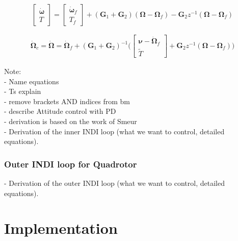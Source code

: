 \documentclass[11pt, a4paper, twoside]{report}
\begin{document}
\begin{equation}
	\begin{bmatrix}
		\bm{\dot{\omega}}\\
		T
	\end{bmatrix} = 
	\begin{bmatrix}
		\bm{\dot{\omega}}_f\\
		T_f
	\end{bmatrix} + (\bm{G}_1+\bm{G}_2)(\bm{\Omega} - \bm{\Omega}_f) - \bm{G}_2z^{-1}(\bm{\Omega} - \bm{\Omega}_f)
	\label{eq:TODO}
\end{equation}

\begin{equation}
	\begin{split}
		\bm{\dot{\Omega}}_c = \bm{\dot{\Omega}} = \bm{\dot{\Omega}}_f + (\bm{G}_1+\bm{G}_2)^{-1} \Bigg(
		\begin{bmatrix}
			\bm{\nu} - \bm{\dot{\Omega}}_f\\
			\tilde{T}
		\end{bmatrix} + \bm{G}_2z^{-1}(\bm{\Omega} - \bm{\Omega}_f) \Bigg)
		\label{eq:TODO}	
	\end{split}
\end{equation}

Note: \\
- Name equations\\
- Ts explain\\
- remove brackets AND indices from bm\\
- describe Attitude control with PD\\
- derivation is based on the work of Smeur\\
- Derivation of the inner INDI loop (what we want to control, detailed equations). \\

\subsection{Outer INDI loop for Quadrotor} \label{subsec: indi_outer}

- Derivation of the outer INDI loop (what we want to control, detailed equations).


\chapter{Implementation} \label{cha:implementation}

\thispagestyle{fancy}
\end{document}
